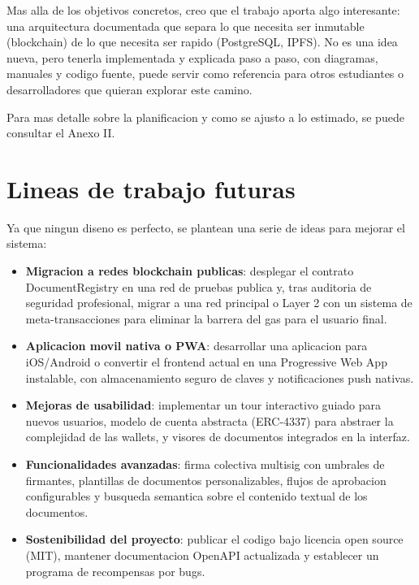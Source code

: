 \documentclass[11pt, a4paper]{article}
\begin{document}
Mas alla de los objetivos concretos, creo que el trabajo aporta algo interesante: una arquitectura documentada que separa lo que necesita ser inmutable (blockchain) de lo que necesita ser rapido (PostgreSQL, IPFS). No es una idea nueva, pero tenerla implementada y explicada paso a paso, con diagramas, manuales y codigo fuente, puede servir como referencia para otros estudiantes o desarrolladores que quieran explorar este camino.

Para mas detalle sobre la planificacion y como se ajusto a lo estimado, se puede consultar el Anexo II.

\section{Lineas de trabajo futuras}

Ya que ningun diseno es perfecto, se plantean una serie de ideas para mejorar el sistema:

\begin{itemize}
    \item \textbf{Migracion a redes blockchain publicas}: desplegar el contrato DocumentRegistry en una red de pruebas publica y, tras auditoria de seguridad profesional, migrar a una red principal o Layer 2 con un sistema de meta-transacciones para eliminar la barrera del gas para el usuario final.
    \item \textbf{Aplicacion movil nativa o PWA}: desarrollar una aplicacion para iOS/Android o convertir el frontend actual en una Progressive Web App instalable, con almacenamiento seguro de claves y notificaciones push nativas.
    \item \textbf{Mejoras de usabilidad}: implementar un tour interactivo guiado para nuevos usuarios, modelo de cuenta abstracta (ERC-4337) para abstraer la complejidad de las wallets, y visores de documentos integrados en la interfaz.
    \item \textbf{Funcionalidades avanzadas}: firma colectiva multisig con umbrales de firmantes, plantillas de documentos personalizables, flujos de aprobacion configurables y busqueda semantica sobre el contenido textual de los documentos.
    \item \textbf{Sostenibilidad del proyecto}: publicar el codigo bajo licencia open source (MIT), mantener documentacion OpenAPI actualizada y establecer un programa de recompensas por bugs.
\end{itemize}
\end{document}
